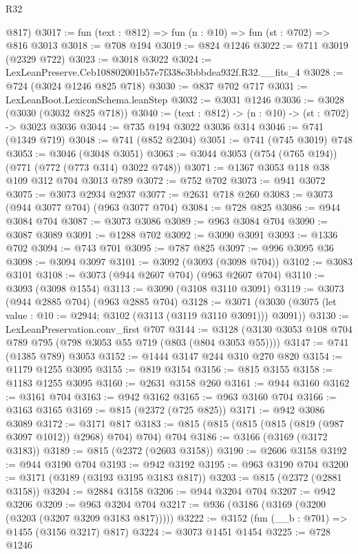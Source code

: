 \begin{lexlean}{R32}
\begin{coremodule}
      @817)
@3017 := fun (text : @812) => fun (n : @10) => fun (st : @702) => @816 @3013
@3018 := @708 @194
@3019 := @824 @1246
@3022 := @711 @3019 (@2329 @722)
@3023 := @3018 @3022
@3024 := LexLeanPreserve.Ceb108802001b57e7f338e3bbbdea932f.R32.__fits_4
@3028 := @724 (@3024 @1246 @825 @718)
@3030 := @837 @702 @717
@3031 := LexLeanBoot.LexiconSchema.leanStep
@3032 := @3031 @1246
@3036 := @3028 (@3030 (@3032 @825 @718))
@3040 := (text : @812) -> (n : @10) -> (st : @702) -> @3023 @3036
@3044 := @735 @194 @3022 @3036 @314
@3046 := @741 (@1349 @719)
@3048 := @741 (@852 @2304)
@3051 := @741 (@745 @3019) @748
@3053 := @3046 (@3048 @3051)
@3063 := @3044 @3053 (@754 (@765 @194)) (@771 (@772 (@773 @314) @3022 @748))
@3071 := @1367 @3053 @118 @38 @109 @312 @704 @3013 @789
@3072 := @752 @702
@3073 := @941 @3072
@3075 := @3073 @2934 @2937
@3077 := @2631 @718 @260
@3083 := @3073 (@944 @3077 @704) (@963 @3077 @704)
@3084 := @728 @825
@3086 := @944 @3084 @704
@3087 := @3073 @3086
@3089 := @963 @3084 @704
@3090 := @3087 @3089
@3091 := @1288 @702
@3092 := @3090 @3091
@3093 := @1336 @702
@3094 := @743 @701
@3095 := @787 @825
@3097 := @996 @3095 @36
@3098 := @3094 @3097
@3101 := @3092 (@3093 (@3098 @704))
@3102 := @3083 @3101
@3108 := @3073 (@944 @2607 @704) (@963 @2607 @704)
@3110 := @3093 (@3098 @1554)
@3113 := @3090 (@3108 @3110 @3091)
@3119 := @3073 (@944 @2885 @704) (@963 @2885 @704)
@3128 := @3071 (@3030 (@3075 (let value : @10 := @2944; @3102 (@3113 (@3119 @3110 @3091))) @3091))
@3130 := LexLeanPreservation.conv_first @707
@3144 := @3128 (@3130 @3053 @108 @704 @789 @795 (@798 @3053 @55 @719 (@803 (@804 @3053 @55))))
@3147 := @741 (@1385 @789) @3053
@3152 := @1444 @3147 @244 @310 @270 @820
@3154 := @1179 @1255 @3095
@3155 := @819 @3154
@3156 := @815 @3155
@3158 := @1183 @1255 @3095
@3160 := @2631 @3158 @260
@3161 := @944 @3160
@3162 := @3161 @704
@3163 := @942 @3162
@3165 := @963 @3160 @704
@3166 := @3163 @3165
@3169 := @815 (@2372 (@725 @825))
@3171 := @942 @3086 @3089
@3172 := @3171 @817
@3183 := @815 (@815 (@815 (@815 (@819 (@987 @3097 @1012)) @2968) @704) @704) @704
@3186 := @3166 (@3169 (@3172 @3183))
@3189 := @815 (@2372 (@2603 @3158))
@3190 := @2606 @3158
@3192 := @944 @3190 @704
@3193 := @942 @3192
@3195 := @963 @3190 @704
@3200 := @3171 (@3189 (@3193 @3195 @3183 @817))
@3203 := @815 (@2372 (@2881 @3158))
@3204 := @2884 @3158
@3206 := @944 @3204 @704
@3207 := @942 @3206
@3209 := @963 @3204 @704
@3217 := @936 (@3186 (@3169 (@3200 (@3203 (@3207 @3209 @3183 @817)))))
@3222 := @3152 (fun (__b : @701) => @1455 (@3156 @3217) @817)
@3224 := @3073 @1451 @1454
@3225 := @728 @1246

\end{coremodule}
\end{lexlean}
